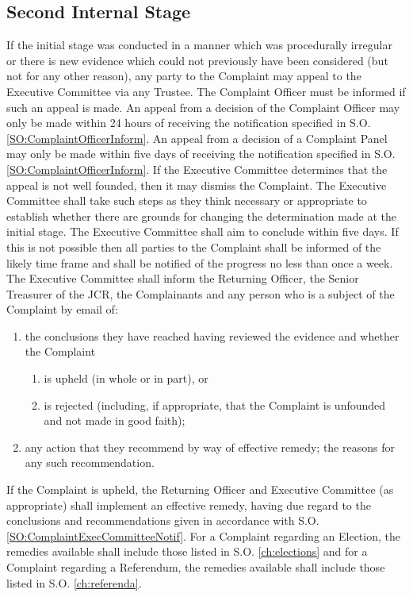\subsection{Second Internal Stage} \label{ssec:ComplaintSecondInternalStage}
\npara If the initial stage was conducted in a manner which was procedurally irregular or there is new evidence which could not previously have been considered (but not for any other reason), any party to the Complaint may appeal to the Executive Committee via any Trustee.  The Complaint Officer must be informed if such an appeal is made.
\npara An appeal from a decision of the Complaint Officer may only be made within 24 hours of receiving the notification specified in S.O. \ref{SO:ComplaintOfficerInform}.  An appeal from a decision of a Complaint Panel may only be made within five days of receiving the notification specified in S.O. \ref{SO:ComplaintOfficerInform}.  If the Executive Committee determines that the appeal is not well founded, then it may dismiss the Complaint. 
\npara The Executive Committee shall take such steps as they think necessary or appropriate to establish whether there are grounds for changing the determination made at the initial stage.  The Executive Committee shall aim to conclude within five days.  If this is not possible then all parties to the Complaint shall be informed of the likely time frame and shall be notified of the progress no less than once a week.
\npara \label{SO:ComplaintExecCommitteeNotif} The Executive Committee shall inform the Returning Officer, the Senior Treasurer of the JCR, the Complainants and any person who is a subject of the Complaint by email of:
\begin{enumerate}
\item the conclusions they have reached having reviewed the evidence and whether the Complaint
\begin{enumerate}
\item is upheld (in whole or in part), or
\item is rejected (including, if appropriate, that the Complaint is unfounded and not made in good faith);
\end{enumerate}
\item any action that they recommend by way of effective remedy;
the reasons for any such recommendation.
\end{enumerate}
\npara If the Complaint is upheld, the Returning Officer and Executive Committee (as appropriate) shall implement an effective remedy, having due regard to the conclusions and recommendations given in accordance with S.O. \ref{SO:ComplaintExecCommitteeNotif}.  For a Complaint regarding an Election, the remedies available shall include those listed in S.O. \ref{ch:elections} and for a Complaint regarding a Referendum, the remedies available shall include those listed in S.O. \ref{ch:referenda}.
